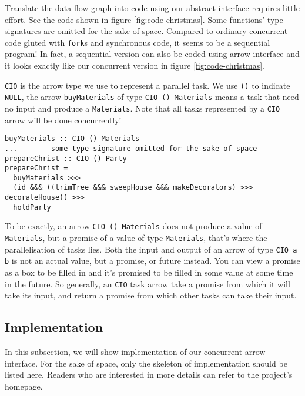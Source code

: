 \documentclass[conference]{IEEEtran}
\begin{document}
Translate the data-flow graph into code using our abstract interface requires little effort. See
the code shown in figure \ref{fig:code-christmas}. Some functions' type signatures are omitted for
the sake of space. Compared to ordinary concurrent code gluted with \texttt{fork}s and synchronous
code, it seems to be a sequential program! In fact, a sequential version can also be coded using
arrow interface and it looks exactly like our concurrent version in figure \ref{fig:code-christmas}.

\texttt{CIO} is the arrow type we use to represent a parallel task. We use
\texttt{()} to indicate \texttt{NULL}, the arrow \texttt{buyMaterials} of type \texttt{CIO () Materials}
means a task that need no input and produce a \texttt{Materials}. Note that all tasks
represented by a \texttt{CIO} arrow will be done concurrently!
\begin{figure*}
  \begin{verbatim}
buyMaterials :: CIO () Materials
...     -- some type signature omitted for the sake of space
prepareChrist :: CIO () Party
prepareChrist = 
  buyMaterials >>>
  (id &&& ((trimTree &&& sweepHouse &&& makeDecorators) >>> decorateHouse)) >>>
  holdParty
  \end{verbatim}
  \caption{Code of Christmas Eve problem}
  \label{fig:code-christmas}
\end{figure*}

To be exactly, an arrow \texttt{CIO () Materials} does not produce a value of \texttt{Materials},
but a promise of a value of type \texttt{Materials}, that's where the parallelisation of tasks lies.
Both the input and output of an arrow of type \texttt{CIO a b} is not an actual value, but a promise,
or future instead. You can view a promise as a box to be filled in and it's promised to be
filled in some value at some time in the future. So generally, an \texttt{CIO} task arrow
take a promise from
which it will take its input, and return a promise from which other tasks can take their input.

\subsection{Implementation}\label{subsec:implementation}
In this subsection, we will show implementation of our concurrent arrow interface. For the sake
of space, only the skeleton of implementation should be listed here. Readers who are interested in more
details can refer to the project's homepage.\cite{CIOHomepage}
\end{document}
